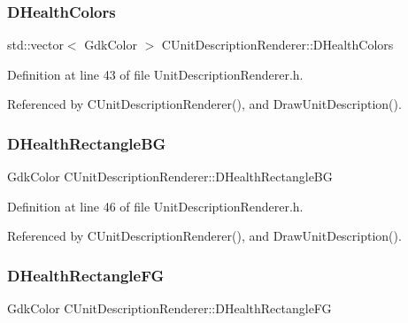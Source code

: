 \subsubsection{\texorpdfstring{D\+Health\+Colors}{DHealthColors}}
{\footnotesize\ttfamily std\+::vector$<$ Gdk\+Color $>$ C\+Unit\+Description\+Renderer\+::\+D\+Health\+Colors\hspace{0.3cm}{\ttfamily [protected]}}



Definition at line 43 of file Unit\+Description\+Renderer.\+h.



Referenced by C\+Unit\+Description\+Renderer(), and Draw\+Unit\+Description().

\hypertarget{classCUnitDescriptionRenderer_ac3f81e657b619785c3babd9026b7c6d2}{}\label{classCUnitDescriptionRenderer_ac3f81e657b619785c3babd9026b7c6d2} 
\subsubsection{\texorpdfstring{D\+Health\+Rectangle\+BG}{DHealthRectangleBG}}
{\footnotesize\ttfamily Gdk\+Color C\+Unit\+Description\+Renderer\+::\+D\+Health\+Rectangle\+BG\hspace{0.3cm}{\ttfamily [protected]}}



Definition at line 46 of file Unit\+Description\+Renderer.\+h.



Referenced by C\+Unit\+Description\+Renderer(), and Draw\+Unit\+Description().

\hypertarget{classCUnitDescriptionRenderer_a0853b06022be60337a5015efb90666bd}{}\label{classCUnitDescriptionRenderer_a0853b06022be60337a5015efb90666bd} 
\subsubsection{\texorpdfstring{D\+Health\+Rectangle\+FG}{DHealthRectangleFG}}
{\footnotesize\ttfamily Gdk\+Color C\+Unit\+Description\+Renderer\+::\+D\+Health\+Rectangle\+FG\hspace{0.3cm}{\ttfamily [protected]}}



